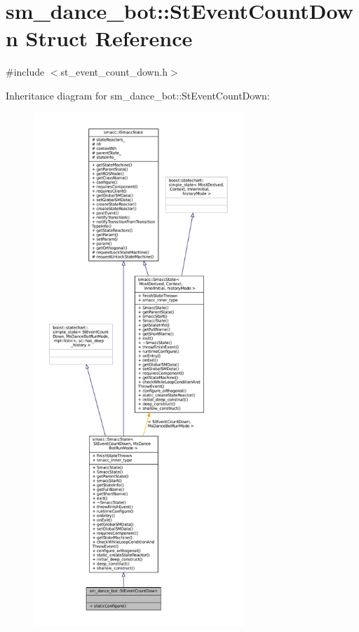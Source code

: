 \hypertarget{structsm__dance__bot_1_1StEventCountDown}{}\section{sm\+\_\+dance\+\_\+bot\+:\+:St\+Event\+Count\+Down Struct Reference}
\label{structsm__dance__bot_1_1StEventCountDown}


{\ttfamily \#include $<$st\+\_\+event\+\_\+count\+\_\+down.\+h$>$}



Inheritance diagram for sm\+\_\+dance\+\_\+bot\+:\+:St\+Event\+Count\+Down\+:
\nopagebreak
\begin{figure}[H]
\begin{center}
\leavevmode
\includegraphics[height=550pt]{structsm__dance__bot_1_1StEventCountDown__inherit__graph}
\end{center}
\end{figure}


